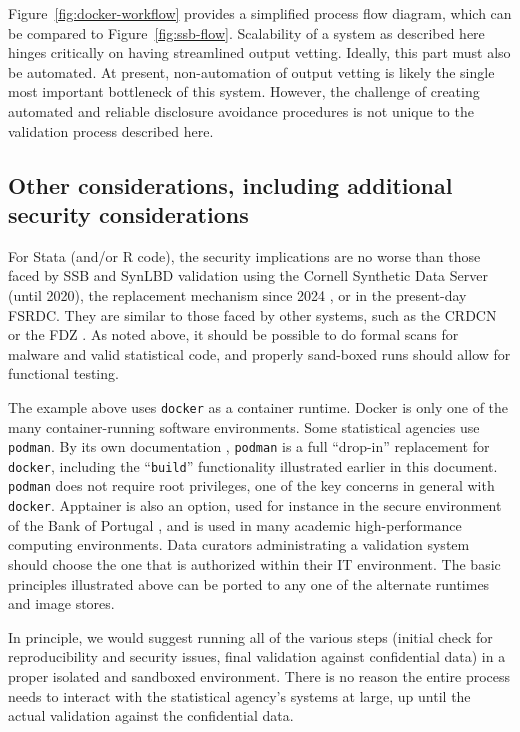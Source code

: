 \documentclass[inline]{hdsr}
\begin{document}
 Figure~\ref{fig:docker-workflow} provides a simplified process flow diagram, which can be compared to Figure~\ref{fig:ssb-flow}. Scalability of a system as described here hinges critically on having streamlined output vetting. Ideally, this  part must also be automated. At present, non-automation of output vetting is likely the single most important bottleneck of this system. However, the challenge of creating automated and reliable disclosure avoidance procedures is  not unique to the validation process described here.

\subsection{Other considerations, including additional security considerations}

For Stata (and/or R code), the security implications are no worse than those  faced by \ac{SSB} and SynLBD validation using the Cornell Synthetic Data Server (until 2020), the replacement  mechanism since 2024 \citep{u.s.censusbureauSIPPSyntheticBeta2015b,us_census_bureau_validating_2023}, or in the present-day \ac{FSRDC}. They are similar to those faced by other systems, such as the \ac{CRDCN} or the \ac{FDZ} \citep{bender_research-data-centre_2011,muller_institute_2021}. As noted above, it should be possible to do formal scans for malware and valid statistical code, and properly sand-boxed runs should allow for functional testing.

The example above uses \texttt{docker} as a container runtime. Docker is only one of the many container-running software environments. Some statistical agencies use \texttt{podman}. By its own documentation \citep{noauthor_podman_nodate}, \texttt{podman} is a full ``drop-in'' replacement for  \texttt{docker}, including the ``\texttt{build}'' functionality illustrated earlier in this document. \texttt{podman} does not require root privileges, one of the key concerns in general with \texttt{docker}. Apptainer \citep{noauthor_apptainer_nodate} is also an option, used for instance in the secure environment of the Bank of Portugal \citep{guimaraes_reproducibility_2023}, and is used in many academic high-performance computing environments. Data curators administrating a validation system should choose the one that is authorized within their IT environment. The basic principles illustrated above can be ported to any one of the alternate runtimes and image stores.

In principle, we would suggest running all of the various steps (initial check for reproducibility and security issues, final validation against confidential data) in a proper isolated and sandboxed environment. There is no reason the entire process needs to interact with the statistical agency's systems at large, up until the actual validation against the confidential data.
\end{document}
